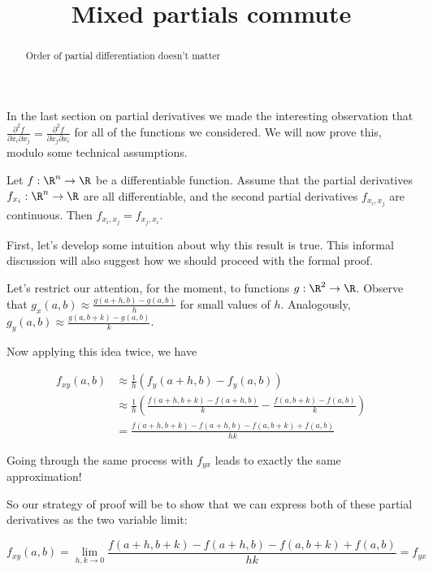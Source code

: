 \documentclass{ximera}
\title{Mixed partials commute}
\begin{document}
	\begin{abstract}
		Order of partial differentiation doesn't matter
	\end{abstract}
	
	In the last section on partial derivatives we made the interesting observation that $\frac{\partial^2 f}{\partial x_i \partial x_j} = \frac{\partial^2 f}{\partial x_j \partial x_i}$
	for all of the functions we considered.  We will now prove this, modulo some technical assumptions.
	
	\begin{theorem}
		Let $f:\R^n \to \R$ be a differentiable function.  Assume that the partial derivatives $f_{x_i}:\R^n \to \R$ are all differentiable, and the second partial derivatives
		$f_{x_i,x_j}$ are continuous.  Then $f_{x_i,x_j} = f_{x_j,x_i}$.
	\end{theorem}
	
	First, let's develop some intuition about why this result is true.  This informal discussion will also suggest how we should proceed with the formal proof.
	
	Let's restrict our attention, for the moment, to functions $g: \R^2 \to \R$.  Observe that  $g_{x}(a,b) \approx \frac{g(a+h,b)-g(a,b)}{h}$ for small values of $h$.  Analogously,
	$g_{y}(a,b) \approx \frac{g(a,b+k)-g(a,b)}{k}$.
	
	Now applying this idea twice, we have 
	
	\begin{align*}
		f_{xy}(a,b) &\approx \frac{1}{h} \left( f_y(a+h,b) - f_y(a,b)\right)\\
			&\approx \frac{1}{h} \left( \frac{f(a+h,b+k)-f(a+h,b)}{k} - \frac{f(a,b+k)-f(a,b)}{k}\right)\\
			&=\frac{f(a+h,b+k)-f(a+h,b)-f(a,b+k)+f(a,b)}{hk}
	\end{align*}
	
	Going through the same process with $f_{yx}$ leads to exactly the same approximation!
	
	So our strategy of proof will be to show that we can express both of these partial derivatives as the two variable limit:
	
	\[
		f_{xy}(a,b) = \displaystyle\lim_{h,k \to 0} \frac{f(a+h,b+k)-f(a+h,b)-f(a,b+k)+f(a,b)}{hk} = f_{yx}
	\]
	
\end{document}
